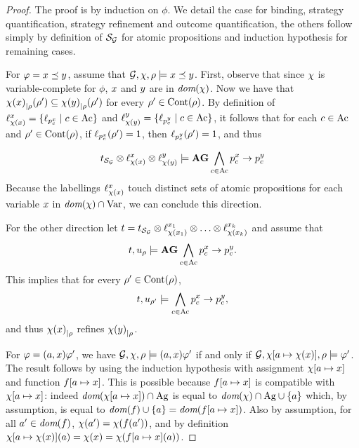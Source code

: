  \begin{proof}
   The proof is by induction on $\phi$.
We detail the case for binding,  strategy quantification, strategy refinement and
outcome quantification, the others follow simply by definition of
$\KS_{\CGS}$ for atomic propositions and induction hypothesis for
remaining cases.

\halfline
For $\phi=\var\refines\varb$,
assume that $\CGS,\assign,{\fplay}\models\var\refines\varb$.
First, observe that since $\assign$ is variable-complete for $\phi$,
$\var$ and $\varb$ are in $\dom(\assign)$.
Now we have that 
$\substrat{\assign(\var)}(\fplay')\subseteq\substrat{\assign(\varb)}(\fplay')$
for every $\fplay'\in \setcontinuations{\fplay}$. By definition of
$\stratlab[\assign(\var)]{\var}=\{\plab[{p_\act^\var}]\mid
\act\in\Act\}$ and
$\stratlab[\assign(\varb)]{\varb}=\{\plab[{p_\act^\varb}]\mid
\act\in\Act\}$, it follows that
 for each $\act\in\Act$ and  $\fplay'\in\setcontinuations{\fplay}$, if
 $\plab[{p_\act^\var}](\fplay')=1$, then
 $\plab[{p_\act^\varb}](\fplay')=1$, and thus

\[\unfold[\KS_{\CGS}]{\sstate_{\pos_\init}}\prodlab
  \stratlab[\assign(\var)]{\var}\prodlab
  \stratlab[\assign(\varb)]{\varb}\models\A\always\biget_{\mov\in\Mov} p_\mov^\var
  \impl p_\mov^{\varb}\]
Because the labellings $\stratlab[\assign(\var)]{\var}$ touch distinct
sets of atomic propositions for each variable $\var$ in
$\dom(\assign)\cap \Varf$, we can conclude this direction.

For the other direction let $\ltree=\unfold[\KS_{\CGS}]{\sstate_{\pos_\init}}\prodlab
\stratlab[\assign(\var_1)]{\var_1}\prodlab\ldots \prodlab
\stratlab[\assign(\var_k)]{\var_k}$ and assume that 
\[\ltree,\noeud_\fplay\models \A\always\biget_{\mov\in\Mov} p_\mov^\var
  \impl p_\mov^{\varb}.\]
This implies that for every $\fplay'\in\setcontinuations{\fplay}$, \[\ltree,\noeud_{\fplay'}\models\biget_{\mov\in\Mov} p_\mov^\var
  \impl p_\mov^{\varb},\] and thus $\substrat{\assign(\var)}$ refines $\substrat{\assign(\varb)}$.

\halfline
For $\phi=\bind{\var}\phi'$, we have
$\CGS,\assign,{\fplay}\models\bind{\var}\phi'$ if and only if 
$\CGS,\assign[\ag\mapsto\assign(\var)],{\fplay}\models\phi'$.
The result follows by using the induction hypothesis with assignment
$\assign[\ag\mapsto\var]$ and function
 $f[a\mapsto\var]$. This is possible because $f[a\mapsto\var]$ is compatible with $\assign[\ag\mapsto\var]$: indeed
 $\dom(\assign[\ag\mapsto\var])\inter\Agf$ is equal to
 $\dom(\assign)\inter\Agf \union \{a\}$ which, by assumption, is equal
 to $\dom(f) \union \{a\}=\dom(f[a\mapsto
 \var])$. Also
 by assumption, for all $a'\in\dom(f)$, $\assign(a')=\assign(f(a'))$, and 
by definition $\assign[a\mapsto \assign(\var)](a)=\assign(\var)=\assign(f[a\mapsto\var](a))$.



\end{proof}
